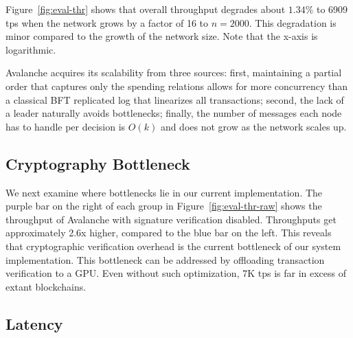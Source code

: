 Figure~\ref{fig:eval-thr} shows that overall throughput degrades about $1.34\%$ to 6909 tps when the network grows by a factor of 16 to $n = 2000$.
This degradation is minor compared to the growth of the network size.
Note that the x-axis is logarithmic.

Avalanche acquires its scalability from three sources: first,
maintaining a partial order that captures only the spending relations
allows for more concurrency than a classical BFT replicated
log that linearizes all transactions; second, the lack of a leader naturally avoids bottlenecks;
finally, the number of messages each node has to handle per decision is $O(k)$ and does not grow as the network scales up.


\subsection{Cryptography Bottleneck}%

We next examine where bottlenecks lie in our current implementation.
The purple bar on the right of each group in Figure~\ref{fig:eval-thr-raw} shows the throughput of Avalanche with signature verification
disabled. Throughputs get approximately 2.6x higher, compared to the blue bar on the left.
This reveals that cryptographic verification overhead is the current bottleneck of our system implementation.
This bottleneck can be addressed by offloading
transaction verification to a GPU\@. Even without such optimization,
7K tps is far in excess of extant blockchains.

\subsection{Latency}%

